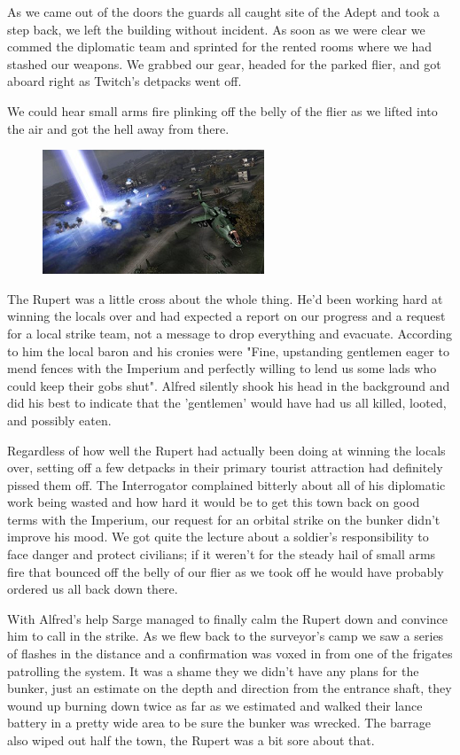 As we came out of the doors the guards all caught site of the Adept and took a step back, we left the building without incident. As soon as we were clear we commed the diplomatic team and sprinted for the rented rooms where we had stashed our weapons. We grabbed our gear, headed for the parked flier, and got aboard right as Twitch's detpacks went off. 

We could hear small arms fire plinking off the belly of the flier as we lifted into the air and got the hell away from there.

\begin{figure}
	\begin{center}
		\includegraphics[width=\figwidth]{pics/6/18.png}
	\end{center}
\end{figure}
The Rupert was a little cross about the whole thing. He'd been working hard at winning the locals over and had expected a report on our progress and a request for a local strike team, not a message to drop everything and evacuate. According to him the local baron and his cronies were "Fine, upstanding gentlemen eager to mend fences with the Imperium and perfectly willing to lend us some lads who could keep their gobs shut". Alfred silently shook his head in the background and did his best to indicate that the 'gentlemen' would have had us all killed, looted, and possibly eaten.

Regardless of how well the Rupert had actually been doing at winning the locals over, setting off a few detpacks in their primary tourist attraction had definitely pissed them off. The Interrogator complained bitterly about all of his diplomatic work being wasted and how hard it would be to get this town back on good terms with the Imperium, our request for an orbital strike on the bunker didn't improve his mood. We got quite the lecture about a soldier's responsibility to face danger and protect civilians; if it weren't for the steady hail of small arms fire that bounced off the belly of our flier as we took off he would have probably ordered us all back down there.

With Alfred's help Sarge managed to finally calm the Rupert down and convince him to call in the strike. 
As we flew back to the surveyor's camp we saw a series of flashes in the distance and a confirmation was voxed in from one of the frigates patrolling the system. %
It was a shame they we didn't have any plans for the bunker, just an estimate on the depth and direction from the entrance shaft, they wound up burning down twice as far as we estimated and walked their lance battery in a pretty wide area to be sure the bunker was wrecked. 
The barrage also wiped out half the town, the Rupert was a bit sore about that.


